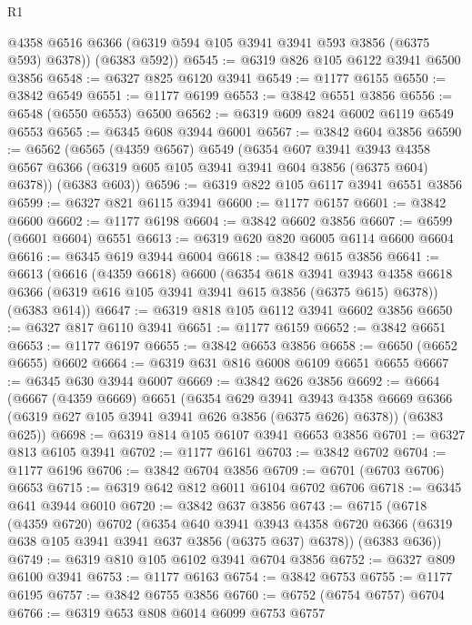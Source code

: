 \begin{lexlean}{R1}
\begin{coremodule}
        @4358
        @6516
        @6366
        (@6319 @594 @105 @3941 @3941 @593 @3856 (@6375 @593) @6378))
      (@6383 @592))
@6545 := @6319 @826 @105 @6122 @3941 @6500 @3856
@6548 := @6327 @825 @6120 @3941
@6549 := @1177 @6155
@6550 := @3842 @6549
@6551 := @1177 @6199
@6553 := @3842 @6551 @3856
@6556 := @6548 (@6550 @6553) @6500
@6562 := @6319 @609 @824 @6002 @6119 @6549 @6553
@6565 := @6345 @608 @3944 @6001
@6567 := @3842 @604 @3856
@6590 := @6562
    (@6565
      (@4359 @6567)
      @6549
      (@6354
        @607
        @3941
        @3943
        @4358
        @6567
        @6366
        (@6319 @605 @105 @3941 @3941 @604 @3856 (@6375 @604) @6378))
      (@6383 @603))
@6596 := @6319 @822 @105 @6117 @3941 @6551 @3856
@6599 := @6327 @821 @6115 @3941
@6600 := @1177 @6157
@6601 := @3842 @6600
@6602 := @1177 @6198
@6604 := @3842 @6602 @3856
@6607 := @6599 (@6601 @6604) @6551
@6613 := @6319 @620 @820 @6005 @6114 @6600 @6604
@6616 := @6345 @619 @3944 @6004
@6618 := @3842 @615 @3856
@6641 := @6613
    (@6616
      (@4359 @6618)
      @6600
      (@6354
        @618
        @3941
        @3943
        @4358
        @6618
        @6366
        (@6319 @616 @105 @3941 @3941 @615 @3856 (@6375 @615) @6378))
      (@6383 @614))
@6647 := @6319 @818 @105 @6112 @3941 @6602 @3856
@6650 := @6327 @817 @6110 @3941
@6651 := @1177 @6159
@6652 := @3842 @6651
@6653 := @1177 @6197
@6655 := @3842 @6653 @3856
@6658 := @6650 (@6652 @6655) @6602
@6664 := @6319 @631 @816 @6008 @6109 @6651 @6655
@6667 := @6345 @630 @3944 @6007
@6669 := @3842 @626 @3856
@6692 := @6664
    (@6667
      (@4359 @6669)
      @6651
      (@6354
        @629
        @3941
        @3943
        @4358
        @6669
        @6366
        (@6319 @627 @105 @3941 @3941 @626 @3856 (@6375 @626) @6378))
      (@6383 @625))
@6698 := @6319 @814 @105 @6107 @3941 @6653 @3856
@6701 := @6327 @813 @6105 @3941
@6702 := @1177 @6161
@6703 := @3842 @6702
@6704 := @1177 @6196
@6706 := @3842 @6704 @3856
@6709 := @6701 (@6703 @6706) @6653
@6715 := @6319 @642 @812 @6011 @6104 @6702 @6706
@6718 := @6345 @641 @3944 @6010
@6720 := @3842 @637 @3856
@6743 := @6715
    (@6718
      (@4359 @6720)
      @6702
      (@6354
        @640
        @3941
        @3943
        @4358
        @6720
        @6366
        (@6319 @638 @105 @3941 @3941 @637 @3856 (@6375 @637) @6378))
      (@6383 @636))
@6749 := @6319 @810 @105 @6102 @3941 @6704 @3856
@6752 := @6327 @809 @6100 @3941
@6753 := @1177 @6163
@6754 := @3842 @6753
@6755 := @1177 @6195
@6757 := @3842 @6755 @3856
@6760 := @6752 (@6754 @6757) @6704
@6766 := @6319 @653 @808 @6014 @6099 @6753 @6757

\end{coremodule}
\end{lexlean}
